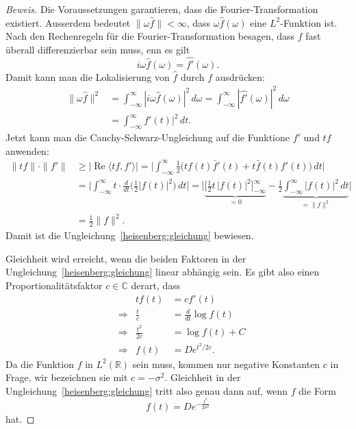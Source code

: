\begin{proof}[Beweis]
Die Voraussetzungen garantieren, dass die Fourier-Transformation existiert.
Ausserdem bedeutet $\|\omega\hat{f}\|<\infty$, dass $\omega\hat{f}(\omega)$ 
eine $L^2$-Funktion ist.
Nach den Rechenregeln für die Fourier-Transformation besagen, dass 
$f$ fast überall differenzierbar sein muss, enn es gilt
\[
i\omega \hat{f}(\omega) = \widehat {f'}(\omega).
\]
Damit kann man die Lokalisierung von $\hat{f}$ durch $f$ ausdrücken:
\begin{align*}
\|\omega \hat{f}\|^2
&=
\int_{-\infty}^\infty |i\omega \hat{f}(\omega)|^2\,d\omega
=
\int_{-\infty}^\infty |\widehat{f'}(\omega)|^2\,d\omega
\\
&=
\int_{-\infty}^\infty f'(t)|^2\,dt.
\end{align*}
Jetzt kann man die Cauchy-Schwarz-Ungleichung auf die Funktione $f'$ und $tf$
anwenden:
\begin{align*}
\|tf\| \cdot \| f'\|
&\ge
| \operatorname{Re}\langle tf,f'\rangle |
=
\biggl|
\int_{-\infty}^\infty
\frac 12\bigl( tf(t)\bar{f}'(t)  + t\bar{f}(t)f'(t)\biggr)\,dt
\biggr|
\\
&=
\biggl|
\int_{-\infty}^\infty t\cdot \frac{d}{dt}\biggl(\frac12|f(t)|^2\biggr)\,dt
\biggr|
=
\biggl|
\underbrace{
\biggl[
\frac12 t\,|f(t)|^2
\biggr]_{-\infty}^{\infty}
}_{\displaystyle=0}
-
\frac12\underbrace{\int_{-\infty}^\infty |f(t)|^2\,dt}_{\displaystyle=\|f\|^2}
\biggr|
\\
&=
\frac12 \|f\|^2.
\end{align*}
Damit ist die Ungleichung~\eqref{heisenberg:gleichung} bewiesen.

Gleichheit wird erreicht, wenn die beiden Faktoren in der 
Ungleichung~\eqref{heisenberg:gleichung} linear abhängig sein.
Es gibt also einen Proportionalitätsfaktor $c\in\mathbb C$ derart,
dass
\[
\begin{aligned}
&&
tf(t)&=cf'(t)
\\
&\Rightarrow&
\frac{t}{c}&=\frac{d}{dt}\log f(t)
\\
&\Rightarrow&
\frac{t^2}{2c}&=\log f(t) + C
\\
&\Rightarrow&
f(t)&=De^{t^2/2c}.
\end{aligned}
\]
Da die Funktion $f$ in $L^2(\mathbb R)$ sein muss, kommen nur negative
Konstanten $c$ in Frage, wir bezeichnen sie mit $c=-\sigma^2$.
Gleichheit in der Ungleichung~\eqref{heisenberg:gleichung} tritt also
genau dann auf, wenn $f$ die Form
\[
f(t) = D e^{-\frac{t^2}{2\sigma^2}}
\]
hat.
\end{proof}



